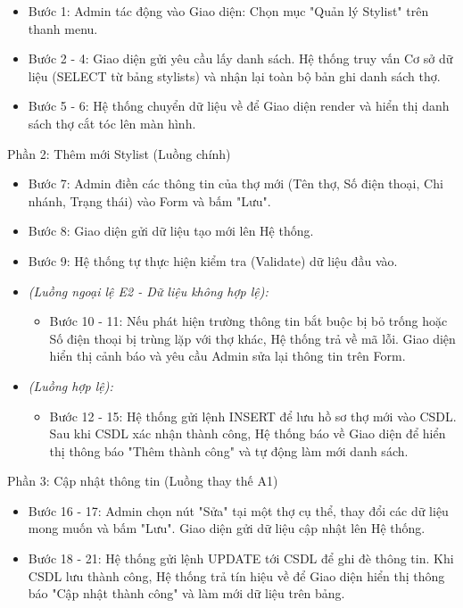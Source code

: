 \documentclass[../BTL.tex]{subfiles}
\begin{document}
\begin{itemize}
\item
  Bước 1: Admin tác động vào Giao diện: Chọn mục "Quản lý Stylist" trên
  thanh menu.
\item
  Bước 2 - 4: Giao diện gửi yêu cầu lấy danh sách. Hệ thống truy vấn Cơ
  sở dữ liệu (SELECT từ bảng stylists) và nhận lại toàn bộ bản ghi danh
  sách thợ.
\item
  Bước 5 - 6: Hệ thống chuyển dữ liệu về để Giao diện render và hiển thị
  danh sách thợ cắt tóc lên màn hình.
\end{itemize}

Phần 2: Thêm mới Stylist (Luồng chính)

\begin{itemize}
\item
  Bước 7: Admin điền các thông tin của thợ mới (Tên thợ, Số điện thoại,
  Chi nhánh, Trạng thái) vào Form và bấm "Lưu".
\item
  Bước 8: Giao diện gửi dữ liệu tạo mới lên Hệ thống.
\item
  Bước 9: Hệ thống tự thực hiện kiểm tra (Validate) dữ liệu đầu vào.
\item
  \emph{(Luồng ngoại lệ E2 - Dữ liệu không hợp lệ):}

  \begin{itemize}
  \item
    Bước 10 - 11: Nếu phát hiện trường thông tin bắt buộc bị bỏ trống
    hoặc Số điện thoại bị trùng lặp với thợ khác, Hệ thống trả về mã
    lỗi. Giao diện hiển thị cảnh báo và yêu cầu Admin sửa lại thông tin
    trên Form.
  \end{itemize}
\item
  \emph{(Luồng hợp lệ):}

  \begin{itemize}
  \item
    Bước 12 - 15: Hệ thống gửi lệnh INSERT để lưu hồ sơ thợ mới vào
    CSDL. Sau khi CSDL xác nhận thành công, Hệ thống báo về Giao diện để
    hiển thị thông báo "Thêm thành công" và tự động làm mới danh sách.
  \end{itemize}
\end{itemize}

Phần 3: Cập nhật thông tin (Luồng thay thế A1)

\begin{itemize}
\item
  Bước 16 - 17: Admin chọn nút "Sửa" tại một thợ cụ thể, thay đổi các dữ
  liệu mong muốn và bấm "Lưu". Giao diện gửi dữ liệu cập nhật lên Hệ
  thống.
\item
  Bước 18 - 21: Hệ thống gửi lệnh UPDATE tới CSDL để ghi đè thông tin.
  Khi CSDL lưu thành công, Hệ thống trả tín hiệu về để Giao diện hiển
  thị thông báo "Cập nhật thành công" và làm mới dữ liệu trên bảng.
\end{itemize}
\end{document}
